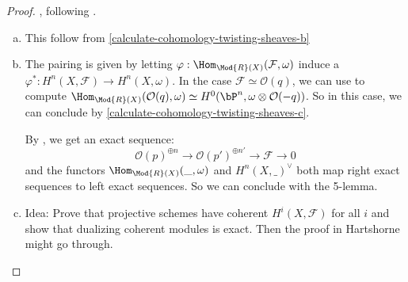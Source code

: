 \begin{proof}
  , following \cite[Ch. III, 7.1]{Hartshorne}.
  \begin{enumerate}[(a)]
  \item This follow from  \ref{calculate-cohomology-twisting-sheaves-b}
  \item The pairing is given by letting $\varphi:\Hom_{\Mod{R}(X)}(\mathcal F,\omega)$ induce a $\varphi^*:H^n(X,\mathcal F)\to H^n(X,\omega)$.
    In the case $\mathcal F\simeq \mathcal O(q)$, we can use 
    to compute $\Hom_{\Mod{R}(X)}(\mathcal O(q),\omega)\simeq H^0(\bP^n,\omega\otimes \mathcal O(-q))$.
    So in this case, we can conclude by  \ref{calculate-cohomology-twisting-sheaves-c}.

    By , we get an exact sequence:
    \[ \mathcal O(p)^{\oplus n}\to\mathcal O(p')^{\oplus n'}\to \mathcal F\to 0 \]
    and the functors $\Hom_{\Mod{R}(X)}(\_,\omega)$ and $H^n(X,\_)^\vee$ both map right exact sequences to left exact sequences. So we can conclude with the 5-lemma.
  \item Idea: Prove that projective schemes have coherent $H^i(X,\mathcal F)$ for all $i$ and show that dualizing coherent modules is exact. Then the proof in Hartshorne might go through.
  \end{enumerate}
\end{proof}
